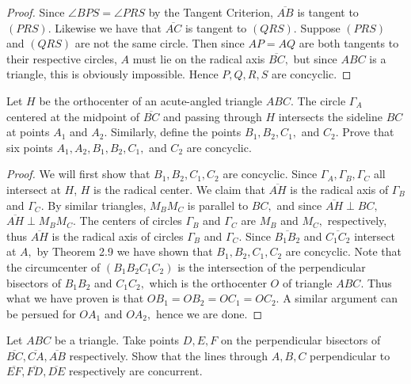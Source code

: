 \documentclass[letterpaper,oneside]{scrartcl}
\begin{document}
\begin{proof}  Since $\angle BPS = \angle PRS$ by the Tangent Criterion, $\overline{AB}$ is tangent to $(PRS).$ Likewise we have that $\overline{AC}$ is tangent to $(QRS).$ Suppose $(PRS)$ and $(QRS)$ are not the same circle. Then since $AP=AQ$ are both tangents to their respective circles, $A$ must lie on the radical axis $\overline{BC},$ but since $ABC$ is a triangle, this is obviously impossible. Hence $P,Q,R,S$ are concyclic. \end{proof}

  

\begin{problem*}
  [2.29, IMO 2008/1]
  Let $H$ be the orthocenter of an acute-angled triangle $ABC.$ The circle $\Gamma_A$ centered at the midpoint of $\overline{BC}$ and passing through $H$ intersects the sideline $BC$ at points $A_1$ and $A_2.$ Similarly, define the points $B_1, B_2, C_1,$ and $C_2.$ Prove that six points $A_1, A_2, B_1, B_2, C_1,$ and $C_2$ are concyclic.
\end{problem*}

\begin{proof}
  We will first show that $B_1, B_2, C_1, C_2$ are concyclic. Since $\Gamma_A,\Gamma_B, \Gamma_C$ all intersect at $H$, $H$ is the radical center. We claim that $\overline{AH}$ is the radical axis of $\Gamma_B$ and $\Gamma_C.$ By similar triangles, $M_BM_C$ is parallel to $BC,$ and since $\overline{AH} \perp BC,$ $\overline{AH} \perp M_BM_C.$ The centers of circles $\Gamma_B$ and $\Gamma_C$ are $M_B$ and $M_C,$ respectively, thus $\overline{AH}$ is the radical axis of circles $\Gamma_B$ and $\Gamma_C.$ Since $\overline{B_1B_2}$ and $\overline{C_1C_2}$ intersect at $A,$ by Theorem 2.9 we have shown that $B_1, B_2,C_1,C_2$ are concyclic. Note that the circumcenter of $(B_1B_2C_1C_2)$ is the intersection of the perpendicular bisectors of $B_1B_2$ and $C_1C_2,$ which is the orthocenter $O$ of triangle $ABC.$ Thus what we have proven is that $OB_1 = OB_2 = OC_1 = OC_2.$ A similar argument can be persued for $OA_1$ and $OA_2,$ hence we are done.
\end{proof}

\begin{problem*}
    [2.30, USAMO 1997/2]
    Let $ABC$ be a triangle. Take points $D, E, F$ on the perpendicular bisectors of $\overline{BC}, \overline{CA}, \overline{AB}$ respectively. Show that the lines through $A, B, C$  perpendicular to $\overline{EF}, \overline{FD}, \overline{DE}$ respectively are concurrent.
\end{problem*}
\end{document}
